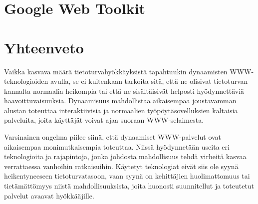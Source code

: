 \section{Google Web Toolkit}




\section{Yhteenveto}

Vaikka kasvava määrä tietoturvahyökkäyksistä tapahtuukin dynaamisten
WWW-teknologioiden avulla, se ei kuitenkaan tarkoita sitä, että ne
olisivat tietoturvan kannalta normaalia heikompia tai että ne
sisältäisivät helposti hyödynnettäviä haavoittuvaisuuksia. Dynaamisuus
mahdollistaa aikaisempaa joustavamman alustan toteuttaa
interaktiivisia ja normaalien työpöytäsovelluksien kaltaisia
palveluita, joita käyttäjät voivat ajaa suoraan
WWW-selaimesta.

Varsinainen ongelma piilee siinä, että dynaamiset WWW-palvelut ovat
aikaisempaa monimutkaisempia toteuttaa. Niissä hyödynnetään useita eri
teknologioita ja rajapintoja, jonka johdosta mahdollisuus tehdä
virheitä kasvaa verrattaessa vanhoihin ratkaisuihin. Käytetyt
teknologiat eivät siis ole syynä heikentyneeseen tietoturvatasoon,
vaan syynä on kehittäjien huolimattomuus tai tietämättömyys niistä
mahdollisuuksista, joita huonosti suunnitellut ja toteutetut palvelut
avaavat hyökkääjille.

